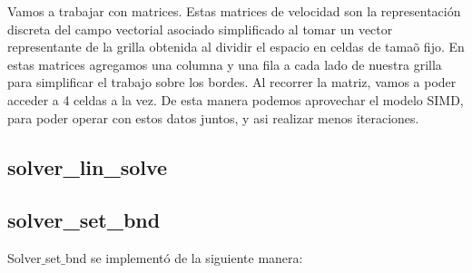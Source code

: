 Vamos a trabajar con matrices. Estas matrices de velocidad son la representaci\'on discreta del campo vectorial asociado simplificado al tomar un vector representante de la grilla obtenida al dividir el espacio en celdas de tama\~o fijo. En estas matrices agregamos una columna y una fila a cada lado de nuestra grilla para simplificar el trabajo sobre los bordes.
Al recorrer la matriz, vamos a poder acceder a 4 celdas a la vez. De esta manera podemos aprovechar el modelo SIMD, para poder operar con estos datos juntos, y asi realizar menos iteraciones.

\subsection{solver\_lin\_solve}


\subsection{solver\_set\_bnd}
Solver$\_$set$\_$bnd se implementó de la siguiente manera:
